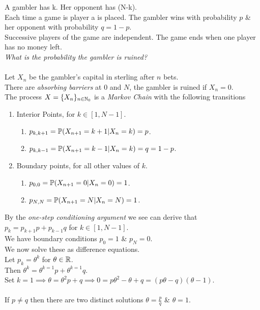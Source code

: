 \documentclass[11pt,a4paper]{article}
\begin{document}
A gambler has \textsterling k. Her opponent has \textsterling (N-k).\\
Each time a game is player a \textsterling is placed. The gambler wins with probability $p$ \& her opponent with probability $q=1-p$.\\
Successive players of the game are independent. The game ends when one player has no money left.\\
\textit{What is the probability the gambler is ruined?}\\
\\
Let $X_n$ be the gambler's capital in sterling after $n$ bets.\\
There are \textit{absorbing barriers} at $0$ and $N$, the gambler is ruined if $X_n=0$.\\
The process $X=\{X_n\}_{n\in\mathbb{N}_0}$ is a \textit{Markov Chain} with the following transitions
\begin{enumerate}[label=\roman*)]
	\item Interior Points, for $k\in[1,N-1]$.
	\begin{enumerate}
		\item $p_{k,k+1}=\mathbb{P}(X_{n+1}=k+1|X_n=k)=p$.
		\item $p_{k,k-1}=\mathbb{P}(X_{n+1}=k-1|X_n=k)=q=1-p$.
	\end{enumerate}
	\item Boundary points, for all other values of $k$.
	\begin{enumerate}
		\item $p_{0,0}=\mathbb{P}(X_{n+1}=0|X_n=0)=1$.
		\item $p_{N,N}=\mathbb{P}(X_{n+1}=N|X_n=N)=1$.
	\end{enumerate}
\end{enumerate}
By the \textit{one-step conditioning argument} we see can derive that $p_k=p_{k+1}p+p_{k-1}q$ for $k\in[1,N-1]$.\\
We have boundary conditions $p_0=1$ \& $p_N=0$.\\
We now solve these as difference equations.\\
Let $p_k=\theta^k$ for $\theta\in\mathbb{R}$.\\
Then $\theta^k=\theta^{k=1}p+\theta^{k=1}q$.\\
Set $k=1\implies\theta=\theta^2p+q\implies0=p\theta^2-\theta+q=(p\theta-q)(\theta-1)$.\\
\\
If $p\neq q$ then there are two distinct solutions $\theta=\frac{p}{q}$ \& $\theta=1$.\\
\end{document}
